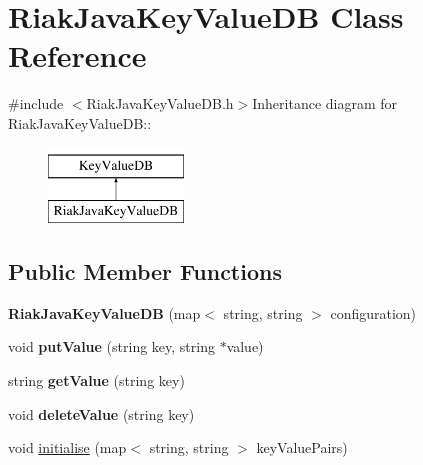 \hypertarget{classRiakJavaKeyValueDB}{
\section{RiakJavaKeyValueDB Class Reference}
\label{classRiakJavaKeyValueDB}
}


{\ttfamily \#include $<$RiakJavaKeyValueDB.h$>$}Inheritance diagram for RiakJavaKeyValueDB::\begin{figure}[H]
\begin{center}
\leavevmode
\includegraphics[height=2cm]{classRiakJavaKeyValueDB}
\end{center}
\end{figure}
\subsection*{Public Member Functions}
\begin{DoxyCompactItemize}
\item 
\hypertarget{classRiakJavaKeyValueDB_ac2b73488926b960d8d76eac2575ff886}{
{\bfseries RiakJavaKeyValueDB} (map$<$ string, string $>$ configuration)}
\label{classRiakJavaKeyValueDB_ac2b73488926b960d8d76eac2575ff886}

\item 
\hypertarget{classRiakJavaKeyValueDB_ad9bb63fe88d2d7baf89adb3e13afc8c3}{
void {\bfseries putValue} (string key, string $\ast$value)}
\label{classRiakJavaKeyValueDB_ad9bb63fe88d2d7baf89adb3e13afc8c3}

\item 
\hypertarget{classRiakJavaKeyValueDB_a5ed0606feebc3fa7f4997b3048dbb4f9}{
string {\bfseries getValue} (string key)}
\label{classRiakJavaKeyValueDB_a5ed0606feebc3fa7f4997b3048dbb4f9}

\item 
\hypertarget{classRiakJavaKeyValueDB_af228bd73a99e8c7ea138a8dad2a0e4cd}{
void {\bfseries deleteValue} (string key)}
\label{classRiakJavaKeyValueDB_af228bd73a99e8c7ea138a8dad2a0e4cd}

\item 
void \hyperlink{classRiakJavaKeyValueDB_aa7e3df85b19f2c3a936a7282f8ddb98f}{initialise} (map$<$ string, string $>$ keyValuePairs)
\end{DoxyCompactItemize}


